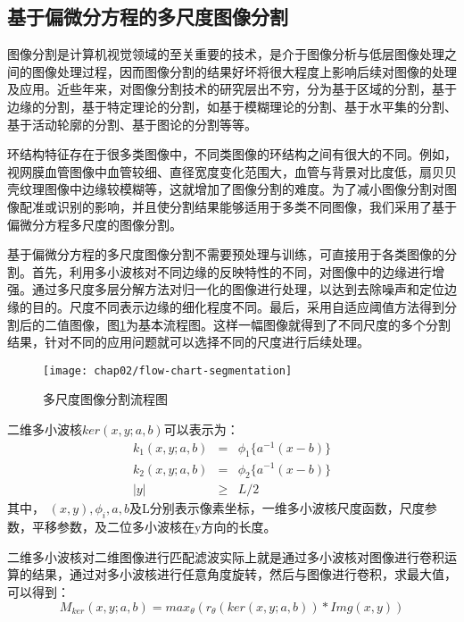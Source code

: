\subsection{基于偏微分方程的多尺度图像分割}

图像分割是计算机视觉领域的至关重要的技术，是介于图像分析与低层图像处理之间的图像处理过程，因而图像分割的结果好坏将很大程度上影响后续对图像的处理及应用。近些年来，对图像分割技术的研究层出不穷，分为基于区域的分割，基于边缘的分割，基于特定理论的分割，如基于模糊理论的分割、基于水平集的分割、基于活动轮廓的分割、基于图论的分割\cite{xuxiaoli}等等。

环结构特征存在于很多类图像中，不同类图像的环结构之间有很大的不同。例如，视网膜血管图像中血管较细、直径宽度变化范围大，血管与背景对比度低，扇贝贝壳纹理图像中边缘较模糊等，这就增加了图像分割的难度。为了减小图像分割对图像配准或识别的影响，并且使分割结果能够适用于多类不同图像，我们采用了基于偏微分方程多尺度的图像分割。

基于偏微分方程的多尺度图像分割\cite{wang2013retinal}不需要预处理与训练，可直接用于各类图像的分割。首先，利用多小波核对不同边缘的反映特性的不同，对图像中的边缘进行增强。通过多尺度多层分解方法对归一化的图像进行处理，以达到去除噪声和定位边缘的目的。尺度不同表示边缘的细化程度不同。最后，采用自适应阈值方法得到分割后的二值图像，图\ref{fig:flow-segmentation}为基本流程图。这样一幅图像就得到了不同尺度的多个分割结果，针对不同的应用问题就可以选择不同的尺度进行后续处理。

\begin{figure}[H]
\centering
    \centering
    \texttt{[image: chap02/flow-chart-segmentation]}\medskip
\caption{多尺度图像分割流程图}
\label{fig:flow-segmentation}
\end{figure}

二维多小波核$ker(x,y;a,b)$可以表示为：
\begin{eqnarray}
k_1(x,y;a,b)&=&\phi_1\{a^{-1}(x-b)\}\\
k_2(x,y;a,b)&=&\phi_2\{a^{-1}(x-b)\}\\
|y| &\geq& L/2
\end{eqnarray}
其中， $(x,y), \phi_i,a,b$及L分别表示像素坐标，一维多小波核尺度函数，尺度参数，平移参数，及二位多小波核在y方向的长度。

二维多小波核对二维图像进行匹配滤波实际上就是通过多小波核对图像进行卷积运算的结果，通过对多小波核进行任意角度旋转，然后与图像进行卷积，求最大值，可以得到：
\begin{equation}
M_{ker}(x,y;a,b) = max_\theta(r_\theta(ker(x,y;a,b)) \ast Img(x,y))
\end{equation} 

